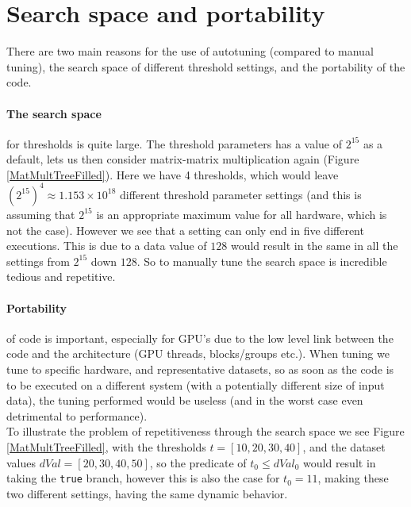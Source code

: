 \section{Search space and portability}
There are two main reasons for the use of autotuning (compared to manual tuning), the search space of different threshold settings, and the portability of the code.
\paragraph{The search space} for thresholds is quite large. The threshold parameters has a value of $2^{15}$ as a default, lets us then consider matrix-matrix multiplication again (Figure \ref{MatMultTreeFilled}). Here we have 4 thresholds, which would leave $\left(2^{15}\right)^4 \approx 1.153\times10^{18}$ different threshold parameter settings (and this is assuming that $2^{15}$ is an appropriate maximum value for all hardware, which is not the case). However we see that a setting can only end in five different executions. This is due to a data value of $128$ would result in the same in all the settings from $2^{15}$ down $128$. So to manually tune the search space is incredible tedious and repetitive.
\paragraph{Portability} of code is important, especially for GPU's due to the low level link between the code and the architecture (GPU threads, blocks/groups etc.). When tuning we tune to specific hardware, and representative datasets, so as soon as the code is to be executed on a different system (with a potentially different size of input data), the tuning performed would be useless (and in the worst case even detrimental to performance).\\

To illustrate the problem of repetitiveness through the search space we see Figure \ref{MatMultTreeFilled}, with the thresholds $t = [10, 20, 30, 40]$, and the dataset values $dVal = [20, 30, 40, 50]$, so the predicate of $t_0 \leq dVal_0$ would result in taking the \texttt{true} branch, however this is also the case for $t_0 = 11$, making these two different settings, having the same dynamic behavior.